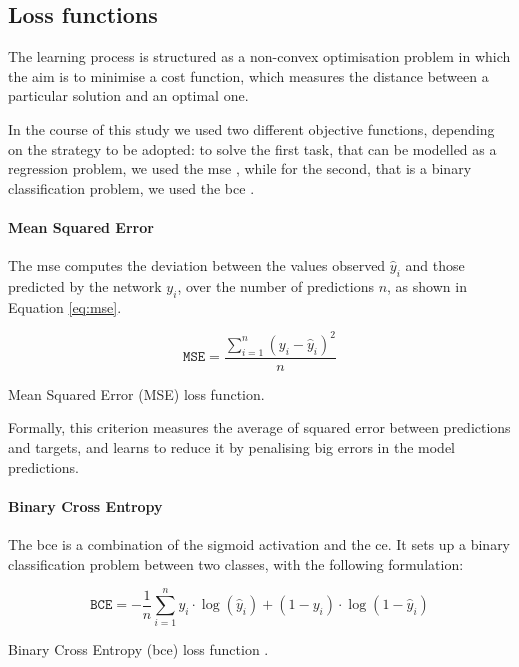 \subsection{Loss functions}
\label{subsec:lossfunctions}
The learning process is structured as a non-convex optimisation problem in which 
the aim is to minimise a cost function, which measures the distance between a 
particular solution and an optimal one.

In the course of this study we used two different objective functions, depending 
on the strategy to be adopted: to solve the first task, that can be modelled as a 
regression problem, we used the \gls{mse} \cite[][]{wang2009mean}, while for the 
second, that is a binary classification problem, we used the \gls{bce} 
\cite[][]{gomez2018understanding}.

\paragraph*{Mean Squared Error} 
The \gls{mse} computes the deviation between the values observed $\hat y_i$ and 
those predicted by the network $y_i$, over the number of predictions $n$, as 
shown in Equation \ref{eq:mse}.
\begin{Equation}[!htb]
	\centering
	\begin{equation}
	\mathtt{MSE} = \frac{\sum_{i=1}^n (y_i-\hat y_i)^2}{n}
	\end{equation}
	\caption{Mean Squared Error (MSE) loss function.}
	\label{eq:mse}
\end{Equation}
Formally, this criterion measures the average of squared error between 
predictions and targets, and learns to reduce it by penalising big errors in the 
model predictions.

\paragraph*{Binary Cross Entropy} 
The \gls{bce} is a combination of the sigmoid activation and the \gls{ce}. It sets up 
a binary classification problem between two classes, with the following 
formulation:

\begin{Equation}[!htb]
	\centering
	\begin{equation}
	\mathtt{BCE} = -\frac{1}{n} \sum_{i=1}^n y_i \cdot \log(\hat y_i) + (1-y_i) 
	\cdot \log(1 - \hat y_i)
	\end{equation}
	\caption[Binary Cross Entropy (BCE) loss function.\bigskip]{Binary Cross 
		Entropy 
		(\gls{bce}) loss function \cite[][]{sadowski2016notes}.}
	\label{eq:bce}
\end{Equation}

